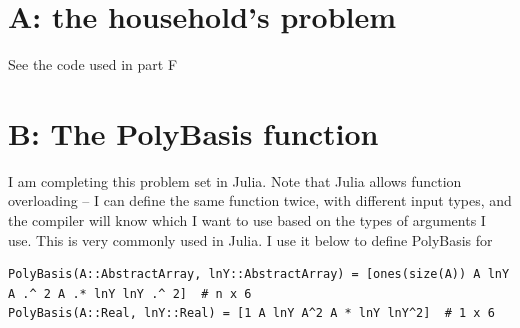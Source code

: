 \documentclass[12pt]{article}
\begin{document}
{}



% 




\section*{A: the household's problem}
See the code used in part F



\newpage
\section*{B: The PolyBasis function}

I am completing this problem set in Julia. Note that Julia allows function overloading -- I can define the same function twice, with different input types, and the compiler will know which I want to use based on the types of arguments I use. This is very commonly used in Julia. I use it below to define PolyBasis for 

\begin{lstlisting}[language=JuliaLocal, style=julia]
PolyBasis(A::AbstractArray, lnY::AbstractArray) = [ones(size(A)) A lnY A .^ 2 A .* lnY lnY .^ 2]  # n x 6
PolyBasis(A::Real, lnY::Real) = [1 A lnY A^2 A * lnY lnY^2]  # 1 x 6
\end{lstlisting}
\end{document}
